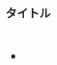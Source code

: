 \documentclass[10pt]{jarticle}
\begin{document}
\begin{titlepage}
    \begin{center}
        {\Large\bf タイトル}\\ %
        {\large }\\ %

    \end{center}
\tableofcontents
\end{titlepage}

\begin{itemize}
    \item
\end{itemize}
\end{document}
